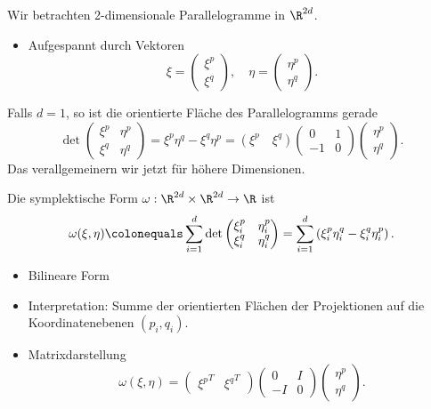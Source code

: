 Wir betrachten 2-dimensionale Parallelogramme in $\R^{2d}$.
\begin{itemize}
\item Aufgespannt durch Vektoren
  \begin{equation*}
    \xi = \begin{pmatrix} \xi^p \\ \xi^q \end{pmatrix},
    \quad
    \eta = \begin{pmatrix} \eta^p \\ \eta^q \end{pmatrix}.
  \end{equation*}
\end{itemize}

Falls $d = 1$, so ist die orientierte Fläche des Parallelogramms gerade
\begin{equation*}
  \det\begin{pmatrix} \xi^p & \eta^p \\ \xi^q & \eta^q \end{pmatrix}
  =
  \xi^p \eta^q - \xi^q \eta^p
  =
  (\xi^p \quad \xi^q)
  \begin{pmatrix} 0 & 1 \\ -1 & 0 \end{pmatrix}
  \begin{pmatrix} \eta^p \\ \eta^q \end{pmatrix}.
\end{equation*}
Das verallgemeinern wir jetzt für höhere Dimensionen.

\begin{definition}
  Die symplektische Form $\omega: \R^{2d} \times \R^{2d} \to \R$ ist
  \begin{equation*}
    \omega(\xi, \eta)
    \colonequals \sum_{i=1}^d \det\begin{pmatrix} \xi_i^p & \eta_i^p \\ \xi_i^q & \eta_i^q \end{pmatrix}
    = \sum_{i=1}^d \left( \xi_i^p \eta_i^q - \xi_i^q \eta_i^p \right).
  \end{equation*}
\end{definition}

\begin{itemize}
\item Bilineare Form
\item Interpretation: Summe der orientierten Flächen der Projektionen auf die Koordinatenebenen $(p_i, q_i)$.
\item Matrixdarstellung
  \begin{equation*}
    \omega(\xi, \eta)
    =
    \begin{pmatrix} {\xi^p}^T & {\xi^q}^T \end{pmatrix}
    \begin{pmatrix} 0 & I \\ -I & 0 \end{pmatrix}
    \begin{pmatrix} \eta^p \\ \eta^q \end{pmatrix}.
  \end{equation*}
\end{itemize}

